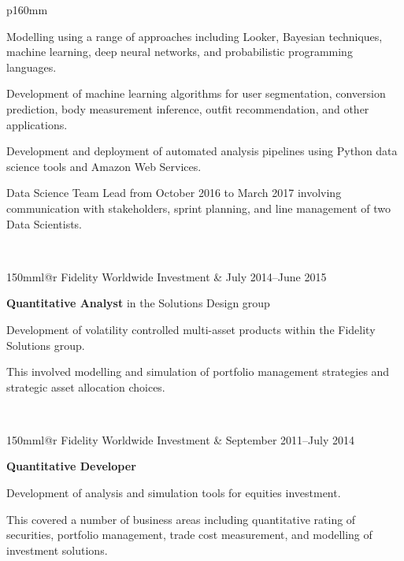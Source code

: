 \documentclass[10pt,a4paper]{article}
\makeatletter
\newcommand{\role}[6]{
\begin{tabular*}{150mm}{l@{\extracolsep{\fill}}r}
#5 & #1--#2 \\ 
\multicolumn{2}{p{145mm}}
{\textbf{#3}#4

{\small #6}} 
\end{tabular*}
\vspace{2mm}
 }
\makeatother
\begin{document}
\begin{tabular}{p{160mm}}
{   \footnotesize{Modelling using a range of approaches including Looker, Bayesian techniques,
   machine learning, deep neural networks, and probabilistic programming languages.

  Development of machine learning algorithms for user segmentation,
   conversion prediction, body measurement inference, outfit recommendation, and other applications.

   Development and deployment of automated analysis pipelines using Python data science tools
   and Amazon Web Services.

   Data Science Team Lead from October 2016 to
   March 2017 involving communication with stakeholders, sprint planning, 
   and line management of two Data Scientists.}
  }\\
  \role{July 2014}{June 2015}{Quantitative Analyst}{ in the Solutions Design
  group}{Fidelity Worldwide Investment}
  {Development of volatility controlled multi-asset products 
  within the Fidelity Solutions group.

  \footnotesize{This involved modelling and simulation of portfolio management
  strategies and strategic asset allocation choices.}}\\
  \role{September 2011}{July 2014}{Quantitative Developer}{}
    {Fidelity Worldwide Investment}
    {Development of analysis and simulation tools for equities investment.

    \footnotesize{This
    covered a number of business areas including quantitative rating of
    securities, portfolio management, trade cost measurement, and
    modelling of investment solutions.

}}
\end{tabular}
\end{document}
